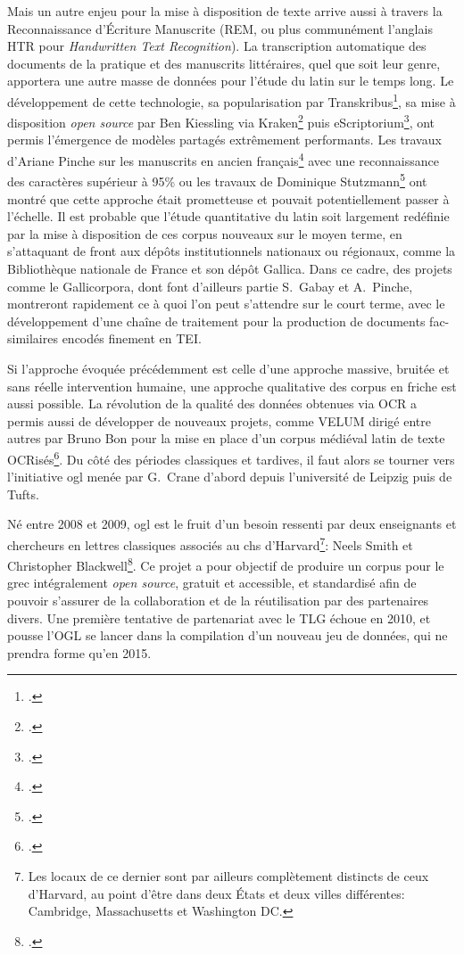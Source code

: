 Mais un autre enjeu pour la mise à disposition de texte arrive aussi à travers la Reconnaissance d'Écriture Manuscrite (REM, ou plus communément l'anglais HTR pour \textit{Handwritten Text Recognition}). La transcription automatique des documents de la pratique et des manuscrits littéraires, quel que soit leur genre, apportera une autre masse de données pour l'étude du latin sur le temps long. Le développement de cette technologie, sa popularisation par Transkribus\footcite{kahle2017transkribus}, sa mise à disposition \textit{open source} par Ben Kiessling via Kraken\footcite{kiessling2019kraken} puis eScriptorium\footcite{kiessling_escripto}, ont permis l'émergence de modèles partagés extrêmement performants. Les travaux d'Ariane Pinche sur les manuscrits en ancien français\footcite{Pinche_CREMMA_Medieval_an_2021} avec une reconnaissance des caractères supérieur à 95\% ou les travaux de Dominique Stutzmann\footcite{hazem2020books} ont montré que cette approche était prometteuse et pouvait potentiellement passer à l'échelle. Il est probable que l'étude quantitative du latin soit largement redéfinie par la mise à disposition de ces corpus nouveaux sur le moyen terme, en s'attaquant de front aux dépôts institutionnels nationaux ou régionaux, comme la Bibliothèque nationale de France et son dépôt Gallica. Dans ce cadre, des projets comme le Gallicorpora, dont font d'ailleurs partie S.~Gabay et A.~Pinche, montreront rapidement ce à quoi l'on peut s'attendre sur le court terme, avec le développement d'une chaîne de traitement pour la production de documents fac-similaires encodés finement en TEI.

Si l'approche évoquée précédemment est celle d'une approche massive, bruitée et sans réelle intervention humaine, une approche qualitative des corpus en friche est aussi possible. La révolution de la qualité des données obtenues via OCR a permis aussi de développer de nouveaux projets, comme VELUM dirigé entre autres par Bruno Bon pour la mise en place d'un corpus médiéval latin de texte OCRisés\footcite{bon2019challenges}. Du côté des périodes classiques et tardives, il faut alors se tourner vers l'initiative \acrfull{ogl} menée par G.~Crane d'abord depuis l'université de Leipzig puis de Tufts.

Né entre 2008 et 2009, \acrshort{ogl} est le fruit d'un besoin ressenti par deux enseignants et chercheurs en lettres classiques associés au \acrfull{chs} d'Harvard\footnote{Les locaux de ce dernier sont par ailleurs complètement distincts de ceux d'Harvard, au point d'être dans deux États et deux villes différentes: Cambridge, Massachusetts et Washington DC.}: Neels Smith et Christopher Blackwell\footcite{muellner2019free}. Ce projet a pour objectif de produire un corpus pour le grec intégralement \textit{open source}, gratuit et accessible, et standardisé afin de pouvoir s'assurer de la collaboration et de la réutilisation par des partenaires divers. Une première tentative de partenariat avec le TLG échoue en 2010, et pousse l'OGL se lancer dans la compilation d'un nouveau jeu de données, qui ne prendra forme qu'en 2015.

